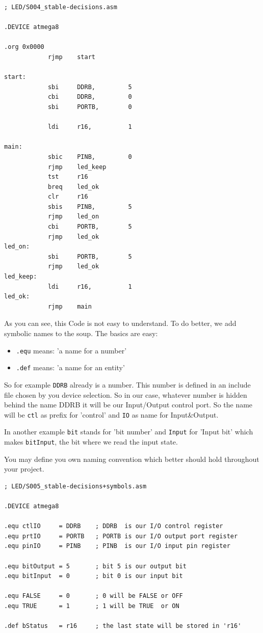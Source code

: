 \begin{lstlisting}
; LED/S004_stable-decisions.asm

.DEVICE atmega8

.org 0x0000
            rjmp    start

start:
            sbi     DDRB,         5
            cbi     DDRB,         0
            sbi     PORTB,        0

            ldi     r16,          1

main:
            sbic    PINB,         0
            rjmp    led_keep
            tst     r16
            breq    led_ok
            clr     r16
            sbis    PINB,         5
            rjmp    led_on
            cbi     PORTB,        5
            rjmp    led_ok
led_on:
            sbi     PORTB,        5
            rjmp    led_ok
led_keep:
            ldi     r16,          1
led_ok:
            rjmp    main
\end{lstlisting}


As you can see, this Code is not easy to understand. To do better, we add symbolic names to the soup. The basics are easy:

\begin{itemize}
  \item \texttt{.equ} means: 'a name for a number'
  \item \texttt{.def} means: 'a name for an entity'
\end{itemize}

So for example \texttt{DDRB} already is a number. This number is defined in an include file chosen by you device selection. So in our case, whatever number is hidden behind the name DDRB it will be our Input/Output control port. So the name will be \texttt{ctl} as prefix for 'control' and \texttt{IO} as name for Input\&Output.

In another example \texttt{bit} stands for 'bit number' and \texttt{Input} for 'Input bit' which makes \texttt{bitInput}, the bit where we read the input state.

You may define you own naming convention which better should hold throughout your project.

\begin{lstlisting}
; LED/S005_stable-decisions+symbols.asm

.DEVICE atmega8

.equ ctlIO     = DDRB    ; DDRB  is our I/O control register
.equ prtIO     = PORTB   ; PORTB is our I/O output port register
.equ pinIO     = PINB    ; PINB  is our I/O input pin register

.equ bitOutput = 5       ; bit 5 is our output bit
.equ bitInput  = 0       ; bit 0 is our input bit

.equ FALSE     = 0       ; 0 will be FALSE or OFF
.equ TRUE      = 1       ; 1 will be TRUE  or ON

.def bStatus   = r16     ; the last state will be stored in 'r16'
\end{lstlisting}

